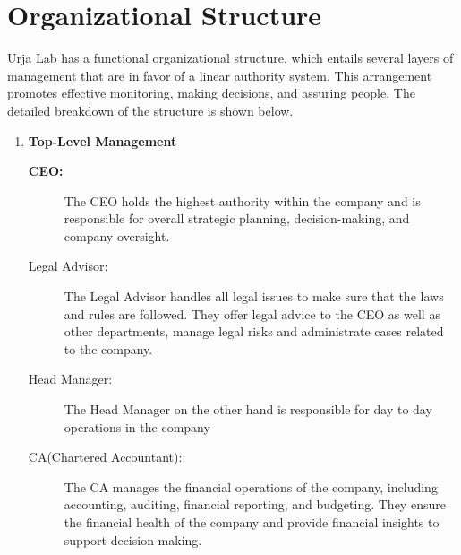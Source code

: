       \section{Organizational Structure}
      Urja Lab has a functional organizational structure, which entails several layers of management that are in favor of a linear authority system. This arrangement promotes effective monitoring, making decisions, and assuring people. The detailed breakdown of the structure is shown below.
        \begin{enumerate}
           \item  \textbf{Top-Level Management}
            \begin{description}
                \item[\textbf{CEO:} ]  The CEO holds the highest authority within the company and is responsible for overall strategic planning, decision-making, and company oversight.
                
                
                \item[Legal Advisor: ]  The Legal Advisor handles all legal issues to make sure that the laws and rules are followed. They offer legal advice to the CEO as well as other departments, manage legal risks and administrate cases related to the company. 


                \item[Head Manager: ]  The Head Manager on the other hand is responsible for day to day operations in the company

                \item[CA(Chartered Accountant): ] The CA manages the financial operations of the company, including accounting, auditing, financial reporting, and budgeting. They ensure the financial health of the company and provide financial insights to support decision-making.
                 
            \end{description}
            

\end{enumerate}
